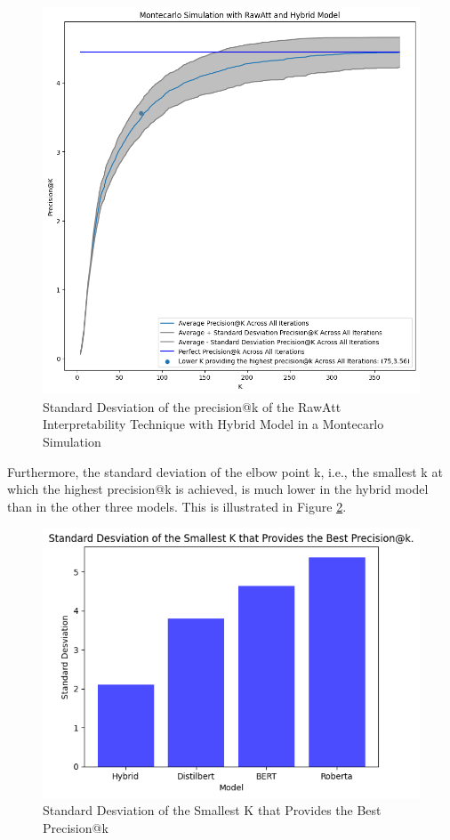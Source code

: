 \begin{figure}[H]
    \centering%
    \includegraphics[width=0.75\linewidth]{Figures/Experimental Setup/Fill_Between_Hybrid_Model_RawAtt.png}
    \caption{Standard Desviation of the precision@k of the RawAtt Interpretability Technique with Hybrid Model in a Montecarlo Simulation}
    \label{mshybrid}
\end{figure}

Furthermore, the standard deviation of the elbow point k, i.e., the smallest k at which the highest precision@k is achieved, is much lower in the hybrid model than in the other three models. This is illustrated in Figure \ref{sdk}.

\newpage

\begin{figure}[h!]
    \centering%
    \includegraphics[width=\linewidth]{Figures/Experimental Setup/sd_k.png}
    \caption{Standard Desviation of the Smallest K that Provides the Best Precision@k}
    \label{sdk}
\end{figure}


